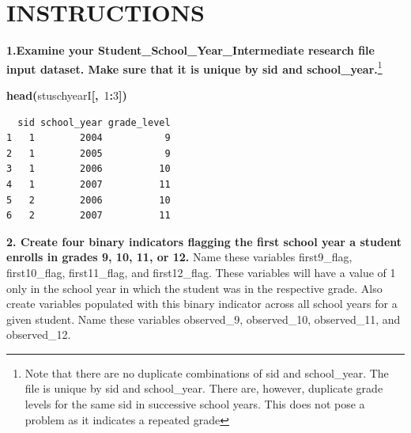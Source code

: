 \documentclass[12pt]{article}
\makeatletter
\newcommand{\hlnumber}[1]{\textcolor[rgb]{0,0,0}{#1}}%
\newcommand{\hlfunctioncall}[1]{\textcolor[rgb]{0.501960784313725,0,0.329411764705882}{\textbf{#1}}}%
\newcommand{\hlkeyword}[1]{\textcolor[rgb]{0,0,0}{\textbf{#1}}}%
\newcommand{\hlsymbol}[1]{\textcolor[rgb]{0,0,0}{#1}}%
\newenvironment{kframe}{%
 \def\FrameCommand##1{\hskip\@totalleftmargin \hskip-\fboxsep
 \colorbox{shadecolor}{##1}\hskip-\fboxsep
     \hskip-\linewidth \hskip-\@totalleftmargin \hskip\columnwidth}%
 \MakeFramed {\advance\hsize-\width
   \@totalleftmargin\z@ \linewidth\hsize
   \@setminipage}}%
 {\par\unskip\endMakeFramed}
\newenvironment{knitrout}{}{} %
\renewenvironment{knitrout}{\begin{footnotesize}}{\end{footnotesize}}
\makeatother
\begin{document}
\section{INSTRUCTIONS}

\textbf{1.Examine your Student\_School\_Year\_Intermediate research file input dataset.  Make sure that it is unique by sid and school\_year.}\footnote{Note that there are no duplicate combinations of sid and school\_year.  The file is unique by sid and school\_year. There are, however, duplicate grade levels for the same sid in successive school years. This does not pose a problem as it indicates a repeated grade}

\begin{knitrout}
\color{fgcolor}\begin{kframe}
\begin{flushleft}
\ttfamily\noindent
\hlfunctioncall{head}\hlkeyword{(}\hlsymbol{stuschyearI}\hlkeyword{[}\hlkeyword{,}{\ }\hlnumber{1}\hlkeyword{:}\hlnumber{3}\hlkeyword{]}\hlkeyword{)}\mbox{}
\normalfont
\end{flushleft}
\begin{verbatim}
  sid school_year grade_level
1   1        2004           9
2   1        2005           9
3   1        2006          10
4   1        2007          11
5   2        2006          10
6   2        2007          11
\end{verbatim}
\end{kframe}
\end{knitrout}


\textbf{2. Create four binary indicators flagging the first school year a student enrolls in grades 9, 10, 11, or 12.} Name these 
variables first9\_flag, first10\_flag, first11\_flag, and first12\_flag. These variables will have a value of 1 only in the school year 
in which the student was in the respective grade.  Also create variables populated with this binary indicator across all school 
years for a given student. Name these variables  observed\_9, observed\_10, observed\_11, and observed\_12.
\end{document}
